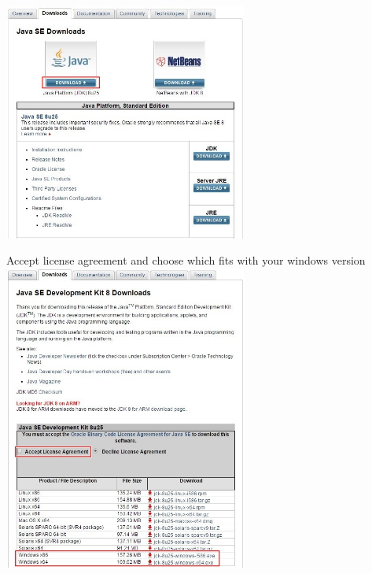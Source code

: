 \documentclass[12pt]{article}
\begin{document}
\begin{center}
\includegraphics[width=80mm,scale=1.3]{jdk2}
\end{center}
\newpage
\begin{center}
Accept license agreement and choose which fits with your windows version\\ [1\baselineskip]
\includegraphics[width=80mm,scale=1.3]{jdk3}
\end{center}
\end{document}
